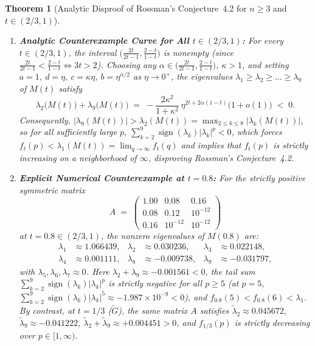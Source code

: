 \documentclass[11pt,a4paper]{article}
\theoremstyle{plain}
\newtheorem{theorem}{Theorem}[section]
\theoremstyle{definition}
\theoremstyle{remark}
\DeclareMathOperator{\sign}{sign}
\begin{document}
\begin{theorem}[Analytic Disproof of Rossman's Conjecture~4.2 for $n \ge 3$ and $t \in (2/3, 1)$]
\begin{enumerate}[label=(\alph*)]
  \item \textbf{Analytic Counterexample Curve for All $t \in (2/3, 1)$:} For every $t \in (2/3, 1)$, the interval $\big(\frac{2t}{2t-1}, \frac{2-t}{1-t}\big)$ is nonempty (since $\frac{2t}{2t-1} < \frac{2-t}{1-t} \iff 3t > 2$). Choosing any $\alpha \in \big(\frac{2t}{2t-1}, \frac{2-t}{1-t}\big)$, $\kappa > 1$, and setting $a = 1$, $d = \eta$, $c = \kappa\eta$, $b = \eta^{\alpha/2}$ as $\eta \to 0^+$, the eigenvalues $\lambda_1 \ge \lambda_2 \ge \dots \ge \lambda_9$ of $M(t)$ satisfy
  \begin{equation}\label{eq:asymptotic_violation}
    \lambda_2\big(M(t)\big) + \lambda_9\big(M(t)\big) \;=\; -\frac{2\kappa^2}{1 + \kappa^2}\, \eta^{2t + 2\alpha(1-t)}\big(1 + o(1)\big) \;<\; 0.
  \end{equation}
  Consequently, $|\lambda_9(M(t))| > \lambda_2(M(t)) = \max_{2 \le k \le 8}|\lambda_k(M(t))|$, so for all sufficiently large $p$, $\sum_{k=2}^9 \sign(\lambda_k)|\lambda_k|^p < 0$, which forces $f_t(p) < \lambda_1(M(t)) = \lim_{q \to \infty} f_t(q)$ and implies that $f_t(p)$ is strictly increasing on a neighborhood of $\infty$, disproving Rossman's Conjecture~4.2.
  \item \textbf{Explicit Numerical Counterexample at $t = 0.8$:} For the strictly positive symmetric matrix
  \[
    A \;=\; \begin{pmatrix} 1.00 & 0.08 & 0.16 \\ 0.08 & 0.12 & 10^{-12} \\ 0.16 & 10^{-12} & 10^{-12} \end{pmatrix}
  \]
  at $t = 0.8 \in (2/3, 1)$, the nonzero eigenvalues of $M(0.8)$ are:
  \begin{align*}
    \lambda_1 &\approx 1.066439, & \lambda_2 &\approx 0.030236, & \lambda_3 &\approx 0.022148, \\
    \lambda_4 &\approx 0.001111, & \lambda_8 &\approx -0.009738, & \lambda_9 &\approx -0.031797,
  \end{align*}
  with $\lambda_5, \lambda_6, \lambda_7 \approx 0$. Here $\lambda_2 + \lambda_9 \approx -0.001561 < 0$, the tail sum $\sum_{k=2}^9 \sign(\lambda_k)|\lambda_k|^p$ is strictly negative for all $p \ge 5$ (at $p = 5$, $\sum_{k=2}^9 \sign(\lambda_k)|\lambda_k|^5 \approx -1.987 \times 10^{-9} < 0$), and $f_{0.8}(5) < f_{0.8}(6) < \lambda_1$. By contrast, at $t = 1/3$ ($\widetilde{G}$), the same matrix $A$ satisfies $\widetilde{\lambda}_2 \approx 0.045672$, $\widetilde{\lambda}_9 \approx -0.041222$, $\widetilde{\lambda}_2 + \widetilde{\lambda}_9 \approx +0.004451 > 0$, and $f_{1/3}(p)$ is strictly decreasing over $p \in [1, \infty)$.
\end{enumerate}
\end{theorem}
\end{document}
